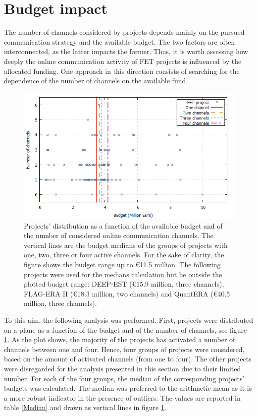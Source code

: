 \section{Budget impact} \label{Budget_impact}
The number of channels considered by projects depends mainly on the pursued communication strategy and the available budget. The two factors are often interconnected, as the latter impacts the former. Thus, it is worth assessing how deeply the online communication activity of FET projects is influenced by the allocated funding. One approach in this direction consists of searching for the dependence of the number of channels on the available fund. 

\begin{figure}[!t] 
 \begin{center}
 \includegraphics[scale=0.4]{Images/Channel_budget.png}
 \caption{Projects' distribution as a function of the available budget and of the number of considered online communication channels. The vertical lines are the budget medians of the groups of projects with one, two, three or four active channels. For the sake of clarity, the figure shows the budget range up to \euro 11.5 million. The following projects were used for the medians calculation but lie outside the plotted budget range:  DEEP-EST (\euro 15.9 million, three channels), FLAG-ERA II (\euro 18.3 million, two channels) and QuantERA (\euro 40.5 million, three channels).}
 \label{Channel_budget}
 \end{center}
\end{figure}

To this aim, the following analysis was performed. First, projects were distributed on a plane as a function of the budget and of the number of channels, see figure \ref{Channel_budget}. As the plot shows, the majority of the projects has activated a number of channels between one and four. Hence, four groups of projects were considered, based on the amount of activated channels (from one to four). The other projects were disregarded for the analysis presented in this section due to their limited number. For each of the four groups, the median of the corresponding projects' budgets was calculated. The median was preferred to the arithmetic mean as it is a more robust indicator in the presence of outliers. The values are reported in table \ref{Median} and drawn as vertical lines in figure \ref{Channel_budget}. 

